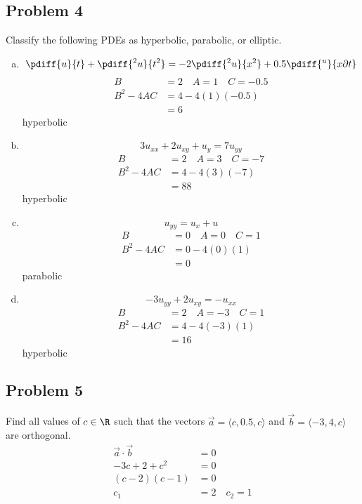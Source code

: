 \documentclass{math}
\begin{document}
\subsection*{Problem 4}
Classify the following PDEs as hyperbolic, parabolic, or elliptic.
\begin{enumerate}[(a)]
  \item \[\pdiff{u}{t}+\pdiff{^2u}{t^2} =
    -2\pdiff{^2u}{x^2}+0.5\pdiff{^u}{x\partial t} \]
  \begin{align*}
    B &= 2 \quad A = 1 \quad C = -0.5 \\
    B^2-4AC &= 4-4(1)(-0.5) \\
    &= 6
  \end{align*}
  hyperbolic
  \item \[ 3u_{xx}+2u_{xy}+u_y = 7u_{yy} \]
  \begin{align*}
    B &= 2 \quad A = 3 \quad C = -7 \\
    B^2-4AC &= 4-4(3)(-7) \\
    &= 88
  \end{align*}
  hyperbolic
  \item \[ u_{yy} = u_x+u \]
  \begin{align*}
    B &= 0 \quad A = 0 \quad C = 1 \\
    B^2-4AC &= 0-4(0)(1) \\
    &= 0
  \end{align*}
  parabolic
  \item \[ -3u_{yy}+2u_{xy} = -u_{xx} \]
  \begin{align*}
    B &= 2 \quad A = -3 \quad C = 1 \\
    B^2-4AC &= 4-4(-3)(1) \\
    &= 16
  \end{align*}
  hyperbolic
\end{enumerate}

\subsection*{Problem 5}
Find all values of \( c\in\R \) such that the vectors \( \vec{a} = \langle
c,0.5,c\rangle \) and \( \vec{b} = \langle-3,4,c\rangle \) are orthogonal.
\begin{align*}
  \vec{a}\cdot\vec{b} &= 0 \\
  -3c+2+c^2 &= 0 \\
  (c-2)(c-1) &= 0 \\
  c_1 &= 2 \quad c_2 = 1
\end{align*}
\end{document}
